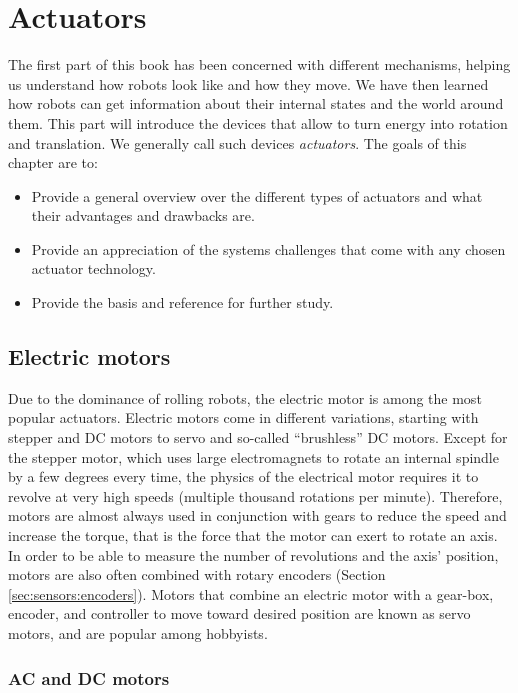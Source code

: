\chapter{Actuators}
The first part of this book has been concerned with different mechanisms, helping us understand how robots look like and how they move. We have then learned how robots can get information about their internal states and the world around them. This part will introduce the devices that allow to turn energy into rotation and translation. We generally call such devices \textsl{actuators}. The goals of this chapter are to:

\begin{itemize}
\item Provide a general overview over the different types of actuators and what their advantages and drawbacks are.
\item Provide an appreciation of the systems challenges that come with any chosen actuator technology.
\item Provide the basis and reference for further study.
\end{itemize}

\section{Electric motors}

Due to the dominance of rolling robots, the electric motor \cite{hughes2019electric} is among the most popular actuators. Electric motors come in different variations, starting with stepper and DC motors to servo and so-called ``brushless'' DC motors. Except for the stepper motor, which uses large electromagnets to rotate an internal spindle by a few degrees every time, the physics of the electrical motor requires it to revolve at very high speeds (multiple thousand rotations per minute). Therefore, motors are almost always used in conjunction with gears to reduce the speed and increase the torque, that is the force that the motor can exert to rotate an axis. In order to be able to measure the number of revolutions and the axis' position, motors are also often combined with rotary encoders (Section \ref{sec:sensors:encoders}). Motors that combine an electric motor with a gear-box, encoder, and controller to move toward desired position are known as servo motors, and are popular among hobbyists.

\subsection{AC and DC motors}

